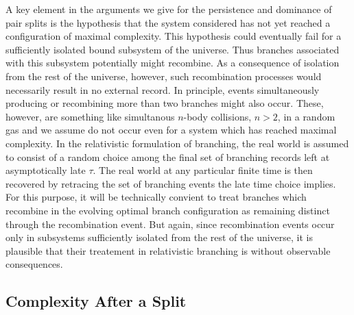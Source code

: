 \documentclass[twocolumn,amsmath,amssymb]{revtex4-1}
\begin{document}
A key element in the arguments we give for the persistence and
dominance of pair splits
is the hypothesis that the system considered has not yet reached
a configuration of maximal complexity.
This hypothesis could eventually fail for
a sufficiently isolated bound subsystem of the universe. 
Thus branches associated with this subsystem
potentially might recombine.
As a consequence of isolation from the rest of the
universe, however, such recombination processes would
necessarily result in no external record.
In principle, events simultaneously producing or recombining more
than two branches might also occur. These, however,
are something like simultanous $n$-body collisions, $n > 2$, 
in a random gas and we assume do not occur even
for a system which has reached maximal complexity.
In the relativistic formulation of branching,
the real world is assumed to consist of
a random choice among
the final set of branching records left
at asymptotically late $\tau$.
The real world at any particular
finite time is then recovered by
retracing the set of branching events
the late time choice implies.
For
this purpose, it will be technically
convient to treat branches which recombine
in the evolving optimal branch configuration
as
remaining distinct through the recombination
event. But again,
since recombination events occur
only in subsystems sufficiently isolated
from the rest of the universe, it
is plausible that their
treatement in relativistic
branching is without observable consequences.



\subsection{\label{subsec:after} Complexity After a Split}
\end{document}
